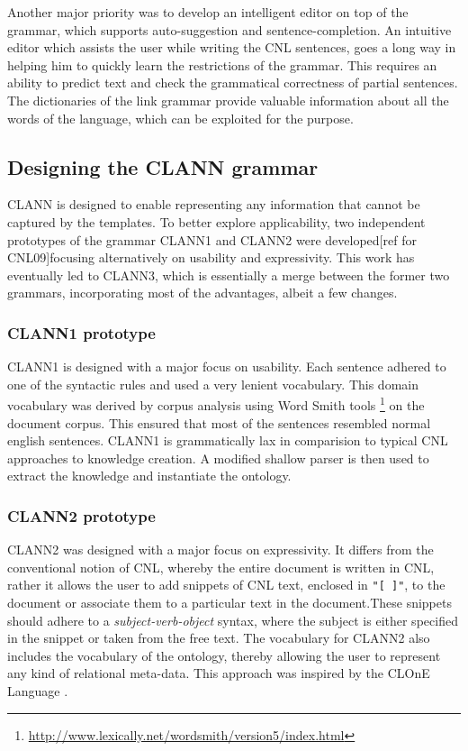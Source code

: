 Another major priority was to develop an intelligent editor on top of the grammar, which supports auto-suggestion and sentence-completion.  An intuitive editor which assists the user while writing the CNL sentences, goes a long way in  helping him to quickly learn the restrictions of the grammar.  This requires an ability to predict text and check the grammatical correctness of partial sentences.  The dictionaries of the link grammar provide valuable information about all the words of the language, which can be exploited for the purpose.
\subsection{Designing the CLANN grammar}
CLANN is designed to enable representing any information that cannot be captured by the templates.  To better explore applicability, two independent prototypes of the grammar CLANN1 and CLANN2 were developed[ref for CNL09]focusing alternatively on usability and expressivity.  This work has eventually led  to CLANN3, which is essentially a merge between the former two grammars, incorporating most of the advantages, albeit a few changes.

\subsubsection{CLANN1 prototype}
CLANN1 is designed with a major focus on usability.  Each sentence adhered to one of the syntactic rules and used a very lenient vocabulary.  This domain vocabulary was derived by corpus analysis using Word Smith tools \footnote{\url{http://www.lexically.net/wordsmith/version5/index.html}} on the document corpus.  This ensured that most of the sentences resembled normal english sentences. CLANN1 is grammatically lax in comparision to typical CNL approaches to knowledge creation. A modified shallow parser is then used to extract the knowledge and instantiate the ontology.
 
\subsubsection{CLANN2 prototype}
CLANN2 was designed with a major focus on expressivity.  It differs from the conventional notion of CNL, whereby the entire document is written in CNL, rather it allows the user to add snippets of CNL text, enclosed in \texttt{"[ ]"}, to the document or associate them to a particular text in the document.These snippets should adhere to a \emph{subject-verb-object} syntax, where the subject is either specified in the snippet or taken from the free text.  The vocabulary for CLANN2 also includes the vocabulary of the ontology, thereby allowing the user to represent any kind of relational meta-data.  This approach was inspired by the CLOnE Language \cite{Funk07}.


